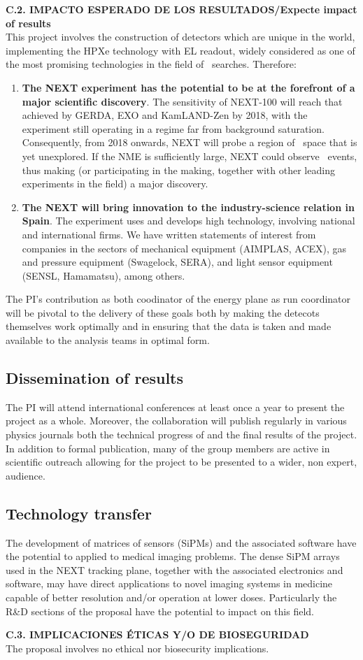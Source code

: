 \documentclass[a4paper,11pt,oneside]{article}
\begin{document}
\noindent\textbf{C.2. IMPACTO ESPERADO DE LOS RESULTADOS/Expecte
  impact of results}\\
This project involves the construction of detectors which are unique in the world, implementing the HPXe technology with EL readout, widely considered as one of the most promising technologies in the field of \bbonu\ searches. Therefore: 
\begin{enumerate}
\item {\bf The NEXT experiment has the potential to be at the
    forefront of a major scientific discovery}. The sensitivity of
  NEXT-100 will reach that achieved by GERDA, EXO and KamLAND-Zen by
  2018, with the experiment still operating in a regime far from
  background saturation. Consequently, from 2018 onwards, NEXT will
  probe a region of \mbb\ space that is yet unexplored. If the NME is
  sufficiently large, NEXT could observe \bbonu\ events, thus making
  (or participating in the making, together with other leading
  experiments in the field) a major discovery.
\item {\bf The NEXT will bring innovation to the industry-science
    relation in Spain}. The experiment uses and develops high
  technology, involving national and international firms. We have
  written statements of interest from companies in the sectors of
  mechanical equipment (AIMPLAS, ACEX), gas and pressure equipment (Swagelock, SERA), and light sensor equipment (SENSL, Hamamatsu), among others.
\end{enumerate}
The PI's contribution as both coodinator of the energy plane as run
coordinator will be pivotal to the delivery of these goals both by
making the detecots themselves work optimally and in ensuring that the
data is taken and made available to the analysis teams in optimal
form.

\subsection*{Dissemination of results}
The PI will attend international conferences at least once a year to
present the project as a whole. Moreover, the collaboration will
publish regularly in various physics journals both the technical
progress of and the final results of the project. In addition to
formal publication, many of the group members are active in scientific
outreach allowing for the project to be presented to a wider, non
expert, audience.

\subsection*{Technology transfer}
The development of matrices of sensors (SiPMs) and the associated
software have the potential to applied to medical imaging
problems. The dense SiPM arrays used in the NEXT tracking plane,
together with the associated electronics and software, may have direct
applications to novel imaging systems in medicine capable of better
resolution and/or operation at lower doses. Particularly the R\&D
sections of the proposal have the potential to impact on this field.
\vspace{12pt}

\noindent\textbf{C.3. IMPLICACIONES \'ETICAS Y/O DE BIOSEGURIDAD}\\
The proposal involves no ethical nor biosecurity implications.
\end{document}
